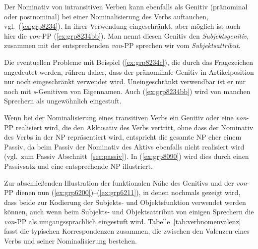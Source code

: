 Der Nominativ von intransitiven Verben kann ebenfalls als Genitiv (pränominal oder postnominal) bei einer Nominalisierung des Verbs auftauchen, vgl.\ (\ref{ex:grp8234}).
In ihrer Verwendung eingeschränkt, aber möglich ist auch hier die \textit{von}-PP (\ref{ex:grp8234bb}).
Man nennt diesen Genitiv den \textit{Subjektsgenitiv}, zusammen mit der entsprechenden \textit{von}-PP sprechen wir vom \textit{Subjektsattribut}.

\begin{exe}
  \ex\label{ex:grp8234}
  \begin{xlist}
  \end{xlist}
\end{exe}

Die eventuellen Probleme mit Beispiel (\ref{ex:grp8234c}), die durch das Fragezeichen angedeutet werden, rühren daher, dass der pränominale Genitiv in Artikelposition nur noch eingeschränkt verwendet wird.
Uneingeschränkt verwendbar ist er nur noch mit \textit{s}-Genitiven von Eigennamen.
Auch (\ref{ex:grp8234bb}) wird von manchen Sprechern als ungewöhnlich eingestuft.

Wenn bei der Nominalisierung eines transitiven Verbs ein Genitiv oder eine \textit{von}-PP realisiert wird, die den Akkusativ des Verbs vertritt, ohne dass der Nominativ des Verbs in der NP repräsentiert wird, entspricht die gesamte NP eher einem Passiv, da beim Passiv der Nominativ des Aktivs ebenfalls nicht realisiert wird (vgl.\ zum Passiv Abschnitt~\ref{sec:passiv}).
In (\ref{ex:grp8090}) wird dies durch einen Passivsatz und eine entsprechende NP illustriert.

\begin{exe}
  \ex\label{ex:grp8090}
  \begin{xlist}
  \end{xlist}
\end{exe}

Zur abschließenden Illustration der funktionalen Nähe des Genitivs und der \textit{von}-PP dienen nun (\ref{ex:grp6200})--(\ref{ex:grp6211}), in denen nochmals gezeigt wird, dass beide zur Kodierung der Subjekts- und Objektsfunktion verwendet werden können, auch wenn beim Subjekts- und Objektsattribut von einigen Sprechern die \textit{von}-PP als umgangssprachlich eingestuft wird.
Tabelle~\ref{tab:verbnomenvalenz} fasst die typischen Korrespondenzen zusammen, die zwischen den Valenzen eines Verbs und seiner Nominalisierung bestehen.

